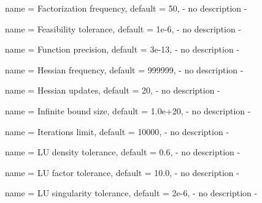 \begin{parameter}{
    name    = {Factorization frequency},
    default = {50},
}
- no description -
\end{parameter}

\begin{parameter}{
    name    = {Feasibility tolerance},
    default = {1e-6},
}
- no description -
\end{parameter}

\begin{parameter}{
    name    = {Function precision},
    default = {3e-13},
}
- no description -
\end{parameter}

\begin{parameter}{
    name    = {Hessian frequency},
    default = {999999},
}
- no description -
\end{parameter}

\begin{parameter}{
    name    = {Hessian updates},
    default = {20},
}
- no description -
\end{parameter}

\begin{parameter}{
    name    = {Infinite bound size},
    default = {1.0e+20},
}
- no description -
\end{parameter}

\begin{parameter}{
    name    = {Iterations limit},
    default = {10000},
}
- no description -
\end{parameter}

\begin{parameter}{
    name    = {LU density tolerance},
    default = {0.6},
}
- no description -
\end{parameter}

\begin{parameter}{
    name    = {LU factor tolerance},
    default = {10.0},
}
- no description -
\end{parameter}

\begin{parameter}{
    name    = {LU singularity tolerance},
    default = {2e-6},
}
- no description -
\end{parameter}

